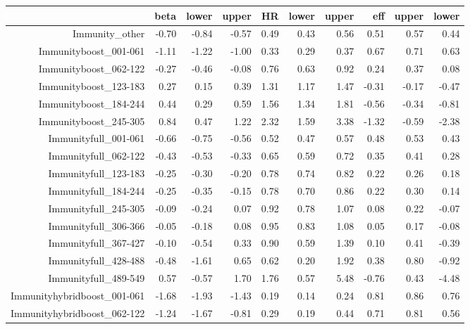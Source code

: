 \begin{table}[ht]
\centering
\begin{tabular}{rrrrrrrrrr}
  \hline
 & beta & lower & upper & HR & lower & upper & eff & upper & lower \\ 
  \hline
Immunity\_other & -0.70 & -0.84 & -0.57 & 0.49 & 0.43 & 0.56 & 0.51 & 0.57 & 0.44 \\ 
  Immunityboost\_001-061 & -1.11 & -1.22 & -1.00 & 0.33 & 0.29 & 0.37 & 0.67 & 0.71 & 0.63 \\ 
  Immunityboost\_062-122 & -0.27 & -0.46 & -0.08 & 0.76 & 0.63 & 0.92 & 0.24 & 0.37 & 0.08 \\ 
  Immunityboost\_123-183 & 0.27 & 0.15 & 0.39 & 1.31 & 1.17 & 1.47 & -0.31 & -0.17 & -0.47 \\ 
  Immunityboost\_184-244 & 0.44 & 0.29 & 0.59 & 1.56 & 1.34 & 1.81 & -0.56 & -0.34 & -0.81 \\ 
  Immunityboost\_245-305 & 0.84 & 0.47 & 1.22 & 2.32 & 1.59 & 3.38 & -1.32 & -0.59 & -2.38 \\ 
  Immunityfull\_001-061 & -0.66 & -0.75 & -0.56 & 0.52 & 0.47 & 0.57 & 0.48 & 0.53 & 0.43 \\ 
  Immunityfull\_062-122 & -0.43 & -0.53 & -0.33 & 0.65 & 0.59 & 0.72 & 0.35 & 0.41 & 0.28 \\ 
  Immunityfull\_123-183 & -0.25 & -0.30 & -0.20 & 0.78 & 0.74 & 0.82 & 0.22 & 0.26 & 0.18 \\ 
  Immunityfull\_184-244 & -0.25 & -0.35 & -0.15 & 0.78 & 0.70 & 0.86 & 0.22 & 0.30 & 0.14 \\ 
  Immunityfull\_245-305 & -0.09 & -0.24 & 0.07 & 0.92 & 0.78 & 1.07 & 0.08 & 0.22 & -0.07 \\ 
  Immunityfull\_306-366 & -0.05 & -0.18 & 0.08 & 0.95 & 0.83 & 1.08 & 0.05 & 0.17 & -0.08 \\ 
  Immunityfull\_367-427 & -0.10 & -0.54 & 0.33 & 0.90 & 0.59 & 1.39 & 0.10 & 0.41 & -0.39 \\ 
  Immunityfull\_428-488 & -0.48 & -1.61 & 0.65 & 0.62 & 0.20 & 1.92 & 0.38 & 0.80 & -0.92 \\ 
  Immunityfull\_489-549 & 0.57 & -0.57 & 1.70 & 1.76 & 0.57 & 5.48 & -0.76 & 0.43 & -4.48 \\ 
  Immunityhybridboost\_001-061 & -1.68 & -1.93 & -1.43 & 0.19 & 0.14 & 0.24 & 0.81 & 0.86 & 0.76 \\ 
  Immunityhybridboost\_062-122 & -1.24 & -1.67 & -0.81 & 0.29 & 0.19 & 0.44 & 0.71 & 0.81 & 0.56 \\ 

\end{tabular}
\end{table}
